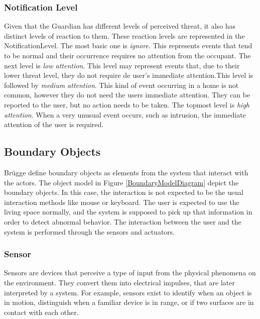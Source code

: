 \subsubsection{Notification Level}
\label{notificationLevels}
Given that the Guardian has different levels of perceived threat, it also has distinct levels of reaction to them. These reaction levels are represented in the NotificationLevel. The most basic one is \textit{ignore}. This represents events that tend to be normal and their occurrence requires no attention from the occupant. The next level is \textit{low attention}. This level may represent events that, due to their lower threat level, they do not require de user's immediate attention.This level is followed by \textit{medium attention}. This kind of event occurring in a home is not common, however they do not need the users immediate attention. They can be reported to the user, but no action needs to be taken. The topmost level is \textit{high attention}. When a very unusual event occurs, such as intrusion, the immediate attention of the user is required.

\subsection{Boundary Objects}

Br{\"u}gge \etAl define boundary objects as elements from the system that interact with the actors. The object model in Figure \ref{BoundaryModelDiagram} depict the boundary objects. 
In this case, the interaction is not expected to be the usual interaction methods like mouse or keyboard. The user is expected to use the living space normally, and the system is supposed to pick up that information in order to detect abnormal behavior. The interaction between the user and the system is performed through the sensors and actuators.


\subsubsection{Sensor}
Sensors are devices that perceive a type of input from the physical phenomena on the environment. They convert them into electrical impulses, that are later interpreted by a system. For example, sensors exist to identify when an object is in motion, distinguish when a familiar device is in range, or if two surfaces are in contact with each other.

